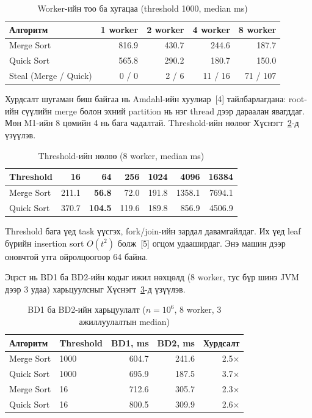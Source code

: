 \documentclass[11pt,a4paper]{article}
\begin{document}
\begin{table}[H]
\centering
\caption{Worker-ийн тоо ба хугацаа (threshold 1000, median ms)}
\label{tab:speed}
\begin{tabular}{@{}lrrrr@{}}
\toprule
Алгоритм & 1 worker & 2 worker & 4 worker & 8 worker \\
\midrule
Merge Sort & 816.9 & 430.7 & 244.6 & 187.7 \\
Quick Sort & 565.8 & 290.2 & 180.7 & 150.0 \\
Steal (Merge / Quick) & 0 / 0 & 2 / 6 & 11 / 16 & 71 / 107 \\
\bottomrule
\end{tabular}
\end{table}

Хурдсалт шугаман биш байгаа нь Amdahl-ийн хуулиар~[4] тайлбарлагдана: root-ийн сүүлийн merge болон эхний partition
нь нэг thread дээр дараалан явагддаг. Мөн M1-ийн 8 цөмийн 4 нь бага чадалтай. Threshold-ийн нөлөөг
Хүснэгт~\ref{tab:th}-д үзүүлэв.

\begin{table}[H]
\centering
\caption{Threshold-ийн нөлөө (8 worker, median ms)}
\label{tab:th}
\begin{tabular}{@{}lrrrrrr@{}}
\toprule
Threshold & 16 & 64 & 256 & 1024 & 4096 & 16384 \\
\midrule
Merge Sort & 211.1 & \textbf{56.8} & 72.0 & 191.8 & 1358.1 & 7694.1 \\
Quick Sort & 370.7 & \textbf{104.5} & 119.6 & 189.8 & 856.9 & 4506.9 \\
\bottomrule
\end{tabular}
\end{table}

Threshold бага үед task үүсгэх, fork/join-ийн зардал давамгайлдаг. Их үед leaf бүрийн insertion sort $O(t^2)$
болж~[5] огцом удааширдаг. Энэ машин дээр оновчтой утга ойролцоогоор 64 байна.

Эцэст нь BD1 ба BD2-ийн кодыг ижил нөхцөлд (8 worker, тус бүр шинэ JVM дээр 3 удаа) харьцуулсныг
Хүснэгт~\ref{tab:before}-д үзүүлэв.

\begin{table}[H]
\centering
\caption{BD1 ба BD2-ийн харьцуулалт ($n=10^6$, 8 worker, 3 ажиллуулалтын median)}
\label{tab:before}
\begin{tabular}{@{}llrrr@{}}
\toprule
Алгоритм & Threshold & BD1, ms & BD2, ms & Хурдсалт \\
\midrule
Merge Sort & 1000 & 604.7 & 241.6 & 2.5× \\
Quick Sort & 1000 & 695.9 & 187.5 & 3.7× \\
Merge Sort & 16 & 712.6 & 305.7 & 2.3× \\
Quick Sort & 16 & 800.5 & 309.9 & 2.6× \\
\bottomrule
\end{tabular}
\end{table}
\end{document}
